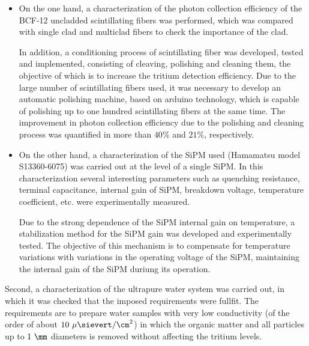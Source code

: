 \begin{itemize}

\item{} On the one hand, a characterization of the photon collection efficiency of the BCF-12 uncladded scintillating fibers was performed, which was compared with single clad and multiclad fibers to check the importance of the clad. 

In addition, a conditioning process of scintillating fiber was developed, tested and implemented, consisting of cleaving, polishing and cleaning them, the objective of which is to increase the tritium detection efficiency. Due to the large number of scintillating fibers used, it was necessary to develop an automatic polishing machine, based on arduino technology, which is capable of polishing up to one hundred scintillating fibers at the same time. The improvement in photon collection efficiency due to the polishing and cleaning process was quantified in more than $40\%$ and $21\%$, respectively. 

\item{} On the other hand, a characterization of the SiPM used (Hamamatsu model S13360-6075) was carried out at the level of a single SiPM. In this characterization several interesting parameters such as quenching resistance, terminal capacitance, internal gain of SiPM, breakdown voltage, temperature coefficient, etc. were experimentally measured. %

Due to the strong dependence of the SiPM internal gain on temperature, a stabilization method for the SiPM gain was developed and experimentally tested. The objective of this mechanism is to compensate for temperature variations with variations in the operating voltage of the SiPM, maintaining the internal gain of the SiPM duriung its operation.

\end{itemize}

Second, a characterization of the ultrapure water system was carried out, in which it was checked that the imposed requirements were fullfit. The requirements are to prepare water samples with very low conductivity (of the order of about $10~\mu\sievert/\cm^2$) in which the organic matter and all particles up to $1~\mm$ diameters is removed without affecting the tritium levels.

